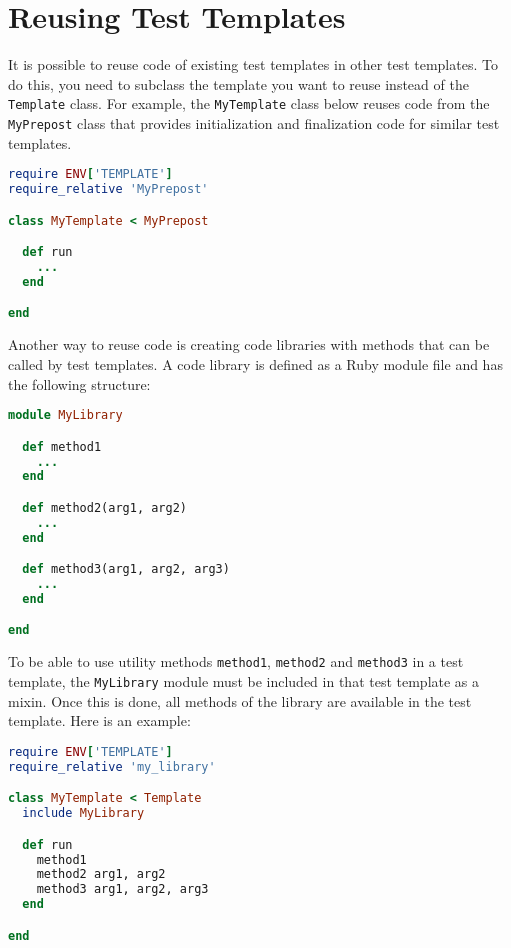 \documentclass[oneside,final,12pt]{extreport}
\begin{document}
\section{Reusing Test Templates}

It is possible to reuse code of existing test templates in other test templates.
To do this, you need to subclass the template you want to reuse instead of the
\texttt{Template} class. For example, the \texttt{MyTemplate} class below reuses code from
the \texttt{MyPrepost} class that provides initialization and finalization code for similar
test templates.

\begin{lstlisting}[language=ruby]
require ENV['TEMPLATE']
require_relative 'MyPrepost'

class MyTemplate < MyPrepost

  def run
    ... 
  end

end
\end{lstlisting}

Another way to reuse code is creating code libraries with methods that can be called
by test templates. A code library is defined as a Ruby module file and has the following
structure:

\begin{lstlisting}[language=ruby]
module MyLibrary

  def method1
    ...
  end

  def method2(arg1, arg2)
    ...
  end

  def method3(arg1, arg2, arg3)
    ...
  end

end
\end{lstlisting}

To be able to use utility methods \texttt{method1}, \texttt{method2} and \texttt{method3}
in a test template, the \texttt{MyLibrary} module must be included in that test template as a mixin.
Once this is done, all methods of the library are available in the test template.
Here is an example:

\begin{lstlisting}[language=ruby]
require ENV['TEMPLATE']
require_relative 'my_library'

class MyTemplate < Template
  include MyLibrary

  def run
    method1
    method2 arg1, arg2
    method3 arg1, arg2, arg3
  end

end
\end{lstlisting}

\end{document}
